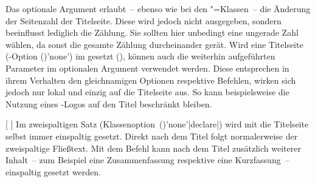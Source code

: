 \begin{Declaration*}{}
\begin{Declaration*}{}
\begin{Declaration*}{}
\begin{Declaration}
\begin{Declaration}[v2.02]{%
}
\begin{Declaration}[v2.02]{}{%
}
\begin{Declaration}[v2.03]{}{%
}
\begin{Declaration}[v2.03]{}{%
}
\begin{Declaration}[v2.03]{%
}{}
\begin{Declaration}[v2.03]{%
}{}
\begin{Declaration}[v2.03]{}{%
}
\begin{Declaration}[v2.03]{}{%
}
\begin{Declaration}[v2.03]{}{%
}
Das optionale Argument erlaubt~-- ebenso wie bei den \KOMAScript"=Klassen~-- 
die Änderung der Seitenzahl der Titelseite. Diese wird jedoch nicht ausgegeben, 
sondern beeinflusst lediglich die Zählung. Sie sollten hier unbedingt eine 
ungerade Zahl wählen, da sonst die gesamte Zählung durcheinander gerät. 
Wird eine Titelseite
(\KOMAScript-Option ()'none') im 
\TUDCD gesetzt (), können auch die weiterhin aufgeführten 
Parameter im optionalen Argument verwendet werden. Diese entsprechen in ihrem 
Verhalten den gleichnamigen Optionen respektive Befehlen, wirken sich jedoch 
nur lokal und einzig auf die Titelseite aus. So kann beispielsweise die Nutzung 
eines \DDC-Logos auf den Titel beschränkt bleiben.
\end{Declaration}
\end{Declaration}
\end{Declaration}
\end{Declaration}
\end{Declaration}
\end{Declaration}
\end{Declaration}
\end{Declaration}
\end{Declaration}
\end{Declaration}

\begin{Declaration}{%
  [%
  ]%
}
\printdeclarationlist%
%
%
%
Im zweispaltigen Satz 
(Klassenoption~()'none'|declare|) wird mit 
 die Titelseite selbst immer einspaltig gesetzt. Direkt nach 
dem Titel folgt normalerweise der zweispaltige Fließtext. Mit dem Befehl 
 kann nach dem Titel zusätzlich weiterer Inhalt~-- 
zum Beispiel eine Zusammenfassung respektive eine Kurzfassung~-- einspaltig 
gesetzt werden.


\end{Declaration}
\end{Declaration*}
\end{Declaration*}
\end{Declaration*}
